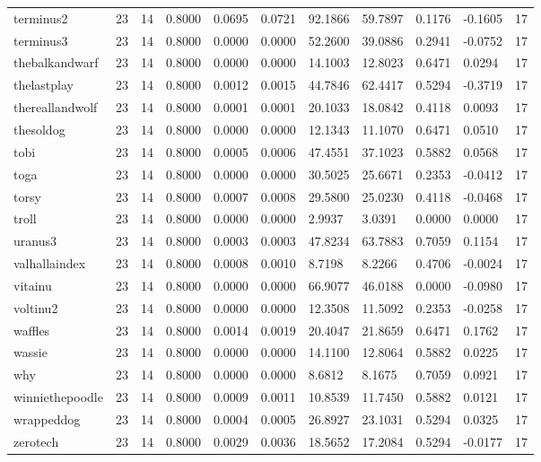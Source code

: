 \begin{table}[htbp]
\begin{tabular}{lllllllllll}
terminus2 & 23 & 14 & 0.8000 & 0.0695 & 0.0721 & 92.1866 & 59.7897 & 0.1176 & -0.1605 & 17 \\
terminus3 & 23 & 14 & 0.8000 & 0.0000 & 0.0000 & 52.2600 & 39.0886 & 0.2941 & -0.0752 & 17 \\
thebalkandwarf & 23 & 14 & 0.8000 & 0.0000 & 0.0000 & 14.1003 & 12.8023 & 0.6471 & 0.0294 & 17 \\
thelastplay & 23 & 14 & 0.8000 & 0.0012 & 0.0015 & 44.7846 & 62.4417 & 0.5294 & -0.3719 & 17 \\
thereallandwolf & 23 & 14 & 0.8000 & 0.0001 & 0.0001 & 20.1033 & 18.0842 & 0.4118 & 0.0093 & 17 \\
thesoldog & 23 & 14 & 0.8000 & 0.0000 & 0.0000 & 12.1343 & 11.1070 & 0.6471 & 0.0510 & 17 \\
tobi & 23 & 14 & 0.8000 & 0.0005 & 0.0006 & 47.4551 & 37.1023 & 0.5882 & 0.0568 & 17 \\
toga & 23 & 14 & 0.8000 & 0.0000 & 0.0000 & 30.5025 & 25.6671 & 0.2353 & -0.0412 & 17 \\
torsy & 23 & 14 & 0.8000 & 0.0007 & 0.0008 & 29.5800 & 25.0230 & 0.4118 & -0.0468 & 17 \\
troll & 23 & 14 & 0.8000 & 0.0000 & 0.0000 & 2.9937 & 3.0391 & 0.0000 & 0.0000 & 17 \\
uranus3 & 23 & 14 & 0.8000 & 0.0003 & 0.0003 & 47.8234 & 63.7883 & 0.7059 & 0.1154 & 17 \\
valhallaindex & 23 & 14 & 0.8000 & 0.0008 & 0.0010 & 8.7198 & 8.2266 & 0.4706 & -0.0024 & 17 \\
vitainu & 23 & 14 & 0.8000 & 0.0000 & 0.0000 & 66.9077 & 46.0188 & 0.0000 & -0.0980 & 17 \\
voltinu2 & 23 & 14 & 0.8000 & 0.0000 & 0.0000 & 12.3508 & 11.5092 & 0.2353 & -0.0258 & 17 \\
waffles & 23 & 14 & 0.8000 & 0.0014 & 0.0019 & 20.4047 & 21.8659 & 0.6471 & 0.1762 & 17 \\
wassie & 23 & 14 & 0.8000 & 0.0000 & 0.0000 & 14.1100 & 12.8064 & 0.5882 & 0.0225 & 17 \\
why & 23 & 14 & 0.8000 & 0.0000 & 0.0000 & 8.6812 & 8.1675 & 0.7059 & 0.0921 & 17 \\
winniethepoodle & 23 & 14 & 0.8000 & 0.0009 & 0.0011 & 10.8539 & 11.7450 & 0.5882 & 0.0121 & 17 \\
wrappeddog & 23 & 14 & 0.8000 & 0.0004 & 0.0005 & 26.8927 & 23.1031 & 0.5294 & 0.0325 & 17 \\
zerotech & 23 & 14 & 0.8000 & 0.0029 & 0.0036 & 18.5652 & 17.2084 & 0.5294 & -0.0177 & 17 \\

\end{tabular}
\end{table}
